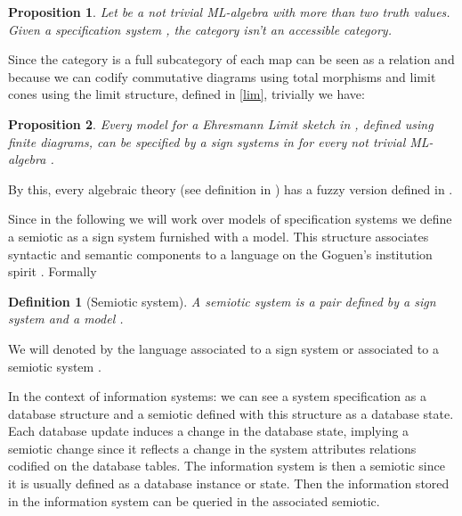 \documentclass[oribibl]{llncs}
\newtheorem{prop}{Proposition}
\newtheorem{defn}{Definition}
\begin{document}
\begin{prop}
Let  be a not trivial ML-algebra with more than two truth values. Given a specification system , the category  isn't an accessible category.
\end{prop}

Since the category  is a full subcategory of  each map can be seen as a relation and because we can codify commutative diagrams using total morphisms and limit cones using the limit structure, defined in \ref{lim}, trivially we have:
\begin{prop}
Every model for a Ehresmann Limit sketch in  ,
defined using finite diagrams, can be specified by a sign systems in
 for every not trivial ML-algebra .
\end{prop}

By this, every algebraic theory (see definition in \cite{Adamek94}) has a fuzzy version defined in .

Since in the following we will work over models of specification systems we define a semiotic as a sign system furnished with a model. This structure associates syntactic and semantic components to a language on the Goguen's  institution spirit \cite{goguen83}. Formally
\begin{defn}[Semiotic system]
A \emph{semiotic system} is a pair  defined by a sign system
 and a model .
\end{defn}
We will denoted by  the language associated to a sign
system  or associated to a semiotic system
.

In the context of information systems: we can see a system specification as a database structure and a semiotic defined with this structure as a database state. Each database update induces a change in the database state, implying a semiotic change since it reflects a change in the system attributes relations codified on the database tables. The information system is then a semiotic since it is usually defined as a database instance or state. Then the information stored in the information system can be queried in the associated semiotic.
\end{document}
